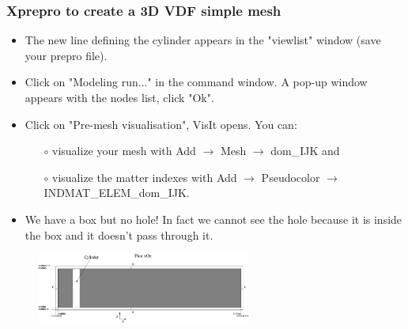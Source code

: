 \documentclass[10pt, hyperref={unicode=true,pdfusetitle, bookmarks=true,bookmarksnumbered=false,bookmarksopen=false, breaklinks=false,pdfborder={0 0 1},backref=true,colorlinks=true,linkcolor=darkblue,pageanchor}]{beamer}
\begin{document}
\begin{frame}
\frametitle{Xprepro to create a 3D VDF simple mesh}
\begin{block}{}

\begin{itemize}
\item The new line defining the cylinder appears in the "viewlist" window (save your prepro file).
\item Click on "Modeling run..." in the command window. A pop-up window appears with the nodes list, click "Ok".
\item Click on "Pre-mesh visualisation", VisIt opens. You can:
    \begin{itemize}
    \item [$\circ$] visualize your mesh with Add $\rightarrow$ Mesh $\rightarrow$ dom\_IJK and
    \item [$\circ$] visualize the matter indexes with Add $\rightarrow$ Pseudocolor $\rightarrow$ INDMAT\_ELEM\_dom\_IJK.
    \end{itemize}
\item We have a box but no hole! In fact we cannot see the hole because it is inside the box and it doesn't pass through it.
\end{itemize}

\begin{figure}
\includegraphics[width=0.63\textwidth]{PICTURES/xprepro2.pdf}
\end{figure}

\end{block}
\end{frame}
\end{document}

